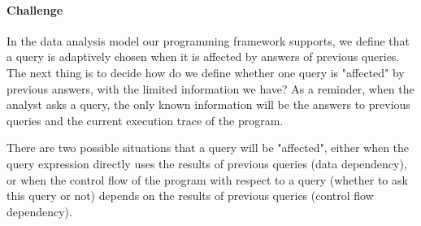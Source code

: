 \paragraph{Challenge}
\label{para:exe-dep-challenge}
In the data analysis model our programming framework supports, 
  we define that a query is adaptively chosen when it is affected by answers of previous queries. The next thing is to decide how do we define whether one query is "affected" by previous answers, with the limited information we have? As a reminder, 
 when the analyst asks a query, the only known information will be the answers to previous queries and the current execution trace of the program.


There are two possible situations that a query will be "affected",  
either when the query expression directly uses the results of previous queries (data dependency), or when the control flow of the program with respect to a query (whether to ask this query or not) depends on the results of previous queries (control flow dependency).


